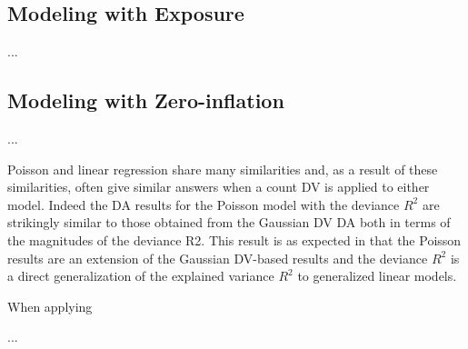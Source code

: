 \documentclass[ShortAfour,times,sageapa]{sagej}
\begin{document}
	\subsection{Modeling with Exposure}
	
	...
	
	\subsection{Modeling with Zero-inflation}
	
	...
	
	
	Poisson and linear regression share many similarities and, as a result of these similarities, often give similar answers when a count DV is applied to either model.
	Indeed the DA results for the Poisson model with the deviance $R^2$ are strikingly similar to those obtained from the Gaussian DV DA both in terms of the magnitudes of the deviance R2.  
	This result is as expected in that the Poisson results are an extension of the Gaussian DV-based results and the deviance $R^2$ is a direct generalization of the explained variance $R^2$ to generalized linear models.
	
	When applying
	
	...
	
\end{document}
